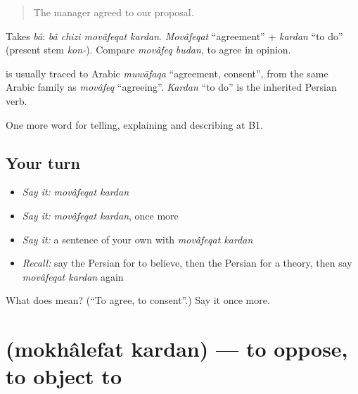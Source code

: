 \begin{quote}
The manager agreed to our proposal.
\end{quote}

Takes \emph{bâ}: \emph{bâ chizi movâfeqat kardan}. \emph{Movâfeqat} \textquotedblleft{}agreement\textquotedblright{} + \emph{kardan} \textquotedblleft{}to do\textquotedblright{} (present stem \emph{kon-}). Compare \emph{movâfeq budan}, to agree in opinion.

\begin{cousinweb}
\textbf{} is usually traced to Arabic \emph{muwāfaqa} \textquotedblleft{}agreement, consent\textquotedblright{}, from the same Arabic family as \emph{movâfeq} \textquotedblleft{}agreeing\textquotedblright{}. \emph{Kardan} \textquotedblleft{}to do\textquotedblright{} is the inherited Persian verb.
\end{cousinweb}

\begin{grammarlens}[title={What you've built}]
One more word for telling, explaining and describing at B1.
\end{grammarlens}

\subsection*{Your turn}
\begin{itemize}
\raggedright
  \item \emph{Say it:} \emph{movâfeqat kardan}
  \item \emph{Say it:} \emph{movâfeqat kardan}, once more
  \item \emph{Say it:} a sentence of your own with \emph{movâfeqat kardan}
  \item \emph{Recall:} say the Persian for to believe, then the Persian for a theory, then say \emph{movâfeqat kardan} again
\end{itemize}

\begin{tcolorbox}[breakable,colback=teal!4,colframe=teal!35!black,title={Before you move on}]
What does   mean? (\textquotedblleft{}To agree, to consent\textquotedblright{}.) Say it once more.
\end{tcolorbox}
\section[\texorpdfstring{\fa{مخالفت} \fa{کردن} (mokhâlefat kardan)}{مخالفت کردن (mokhâlefat kardan)}]{  (mokhâlefat kardan) — to oppose, to object to}

